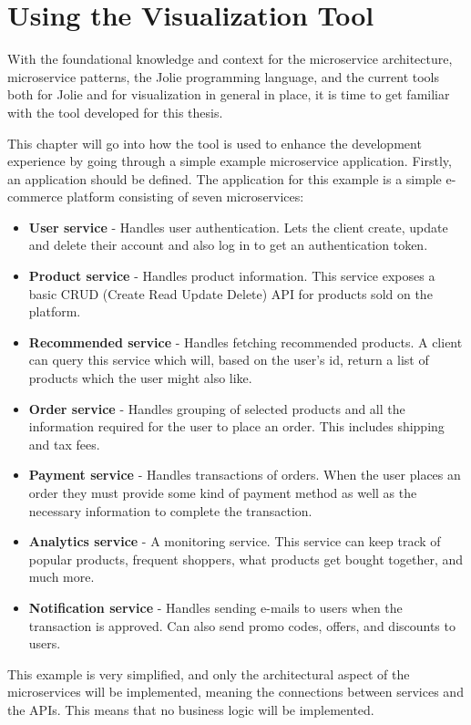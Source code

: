 \chapter{Using the Visualization Tool}

With the foundational knowledge and context for the microservice architecture, microservice patterns, the Jolie programming language, and the current tools both for Jolie and for visualization in general in place, it is time to get familiar with the tool developed for this thesis.

This chapter will go into how the tool is used to enhance the development experience by going through a simple example microservice application.
Firstly, an application should be defined. The application for this example is a simple e-commerce platform consisting of seven microservices:

\begin{itemize}
    \item \textbf{User service} - Handles user authentication. Lets the client create, update and delete their account and also log in to get an authentication token.
    \item \textbf{Product service} - Handles product information. This service exposes a basic CRUD (Create Read Update Delete) API for products sold on the platform.
    \item \textbf{Recommended service} - Handles fetching recommended products. A client can query this service which will, based on the user's id, return a list of products which the user might also like.
    \item \textbf{Order service} - Handles grouping of selected products and all the information required for the user to place an order. This includes shipping and tax fees.
    \item \textbf{Payment service} - Handles transactions of orders. When the user places an order they must provide some kind of payment method as well as the necessary information to complete the transaction.
    \item \textbf{Analytics service} - A monitoring service. This service can keep track of popular products, frequent shoppers, what products get bought together, and much more.
    \item \textbf{Notification service} - Handles sending e-mails to users when the transaction is approved. Can also send promo codes, offers, and discounts to users.
\end{itemize}
This example is very simplified, and only the architectural aspect of the microservices will be implemented, meaning the connections between services and the APIs. This means that no business logic will be implemented.

